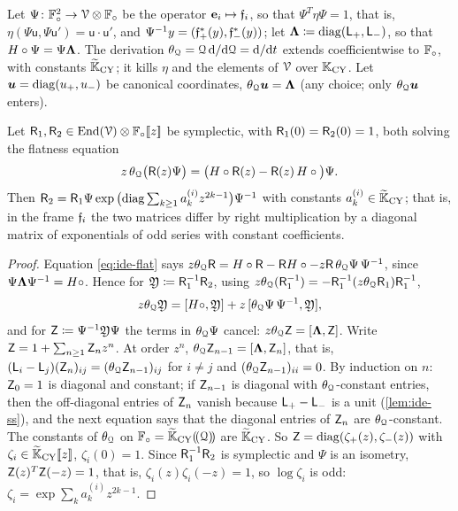 Let $\Psi\colon\mathbb{F}_{\circ}^2\to\mathcal{V}\otimes\mathbb{F}_{\circ}$ be the operator $\mathbf{e}_i\mapsto\mathfrak{f}_i$, so that $\Psi^T\eta\Psi=1$, that is, $\eta(\Psi\mathsf{u},\Psi\mathsf{u}')=\mathsf{u}\cdot\mathsf{u}'$, and $\Psi^{-1}y=(\mathfrak{f}_+^*(y),\mathfrak{f}_-^*(y))$; let $\boldsymbol{\Lambda}\coloneqq\mathrm{diag}(\mathsf{L}_+,\mathsf{L}_-)$, so that $H\circ\Psi=\Psi\boldsymbol{\Lambda}$. The derivation $\theta_{\mathcal{Q}}=\mathcal{Q}\,\mathrm{d}/\mathrm{d}\mathcal{Q}=\mathrm{d}/\mathrm{d} t$ extends coefficientwise to $\mathbb{F}_{\circ}$, with constants $\widetilde{\mathbb{K}}_{\mathrm{CY}}$; it kills $\eta$ and the elements of $\mathcal{V}$ over $\mathbb{K}_{\mathrm{CY}}$. Let $\boldsymbol{u}=\mathrm{diag}(u_+,u_-)$ be canonical coordinates, $\theta_{\mathcal{Q}}\boldsymbol{u}=\boldsymbol{\Lambda}$ (any choice; only $\theta_{\mathcal{Q}}\boldsymbol{u}$ enters).

\begin{lem}
\label{lem:ide-ambig}
Let $\mathsf{R}_1,\mathsf{R}_2\in\operatorname{End}(\mathcal{V})\otimes\mathbb{F}_{\circ}[\![ z ]\!]$ be symplectic, with $\mathsf{R}_1(0)=\mathsf{R}_2(0)=1$, both solving the flatness equation
\begin{equation}
\label{eq:ide-flat}
z\,\theta_{\mathcal{Q}}\big(\mathsf{R}(z)\Psi\big)=\big(H\circ\mathsf{R}(z)-\mathsf{R}(z)\,H\circ\big)\Psi .
\end{equation}
Then $\mathsf{R}_2=\mathsf{R}_1\Psi\exp\big(\mathrm{diag}\sum_{k\geq 1}a_k^{(i)}z^{2k-1}\big)\Psi^{-1}$ with constants $a_k^{(i)}\in\widetilde{\mathbb{K}}_{\mathrm{CY}}$; that is, in the frame $\mathfrak{f}_i$ the two matrices differ by right multiplication by a diagonal matrix of exponentials of odd series with constant coefficients.
\end{lem}
\begin{proof}
Equation \cref{eq:ide-flat} says $z\theta_{\mathcal{Q}}\mathsf{R}=H\circ\mathsf{R}-\mathsf{R} H\circ-z\mathsf{R}\,\theta_{\mathcal{Q}}\Psi\,\Psi^{-1}$, since $\Psi\boldsymbol{\Lambda}\Psi^{-1}=H\circ$. Hence for $\mathfrak{Y}\coloneqq\mathsf{R}_1^{-1}\mathsf{R}_2$, using $z\theta_{\mathcal{Q}}(\mathsf{R}_1^{-1})=-\mathsf{R}_1^{-1}(z\theta_{\mathcal{Q}}\mathsf{R}_1)\mathsf{R}_1^{-1}$,
\[
z\theta_{\mathcal{Q}}\mathfrak{Y}=[H\circ,\mathfrak{Y}]+z\,[\theta_{\mathcal{Q}}\Psi\,\Psi^{-1},\mathfrak{Y}],
\]
and for $\mathsf{Z}\coloneqq\Psi^{-1}\mathfrak{Y}\Psi$ the terms in $\theta_{\mathcal{Q}}\Psi$ cancel: $z\theta_{\mathcal{Q}}\mathsf{Z}=[\boldsymbol{\Lambda},\mathsf{Z}]$. Write $\mathsf{Z}=1+\sum_{n\geq 1}\mathsf{Z}_nz^n$. At order $z^n$, $\theta_{\mathcal{Q}}\mathsf{Z}_{n-1}=[\boldsymbol{\Lambda},\mathsf{Z}_n]$, that is, $(\mathsf{L}_i-\mathsf{L}_j)(\mathsf{Z}_n)_{ij}=(\theta_{\mathcal{Q}}\mathsf{Z}_{n-1})_{ij}$ for $i\neq j$ and $(\theta_{\mathcal{Q}}\mathsf{Z}_{n-1})_{ii}=0$. By induction on $n$: $\mathsf{Z}_0=1$ is diagonal and constant; if $\mathsf{Z}_{n-1}$ is diagonal with $\theta_{\mathcal{Q}}$-constant entries, then the off-diagonal entries of $\mathsf{Z}_n$ vanish because $\mathsf{L}_+-\mathsf{L}_-$ is a unit (\cref{lem:ide-ss}), and the next equation says that the diagonal entries of $\mathsf{Z}_n$ are $\theta_{\mathcal{Q}}$-constant. The constants of $\theta_{\mathcal{Q}}$ on $\mathbb{F}_{\circ}=\widetilde{\mathbb{K}}_{\mathrm{CY}}(\!(\mathcal{Q})\!)$ are $\widetilde{\mathbb{K}}_{\mathrm{CY}}$. So $\mathsf{Z}=\mathrm{diag}(\zeta_+(z),\zeta_-(z))$ with $\zeta_i\in\widetilde{\mathbb{K}}_{\mathrm{CY}}[\![ z ]\!]$, $\zeta_i(0)=1$. Since $\mathsf{R}_1^{-1}\mathsf{R}_2$ is symplectic and $\Psi$ is an isometry, $\mathsf{Z}(z)^T\mathsf{Z}(-z)=1$, that is, $\zeta_i(z)\zeta_i(-z)=1$, so $\log\zeta_i$ is odd: $\zeta_i=\exp\sum_ka_k^{(i)}z^{2k-1}$.
\end{proof}

